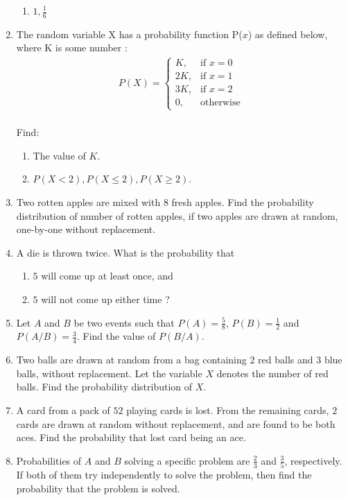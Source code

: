 \begin{enumerate}[label=\thesection.\arabic*.,ref=\thesection.\theenumi]
\begin{enumerate}
\item $1, \frac{1}{6}$
\end{enumerate}
\item The random variable X has a probability function P($x$) as defined below, where K is some number :
\\ \begin{align}P(X)=\begin{cases} K, & \text{if }  x=0 \\ 2K, & \text{if } x=1\\ 3K, & \text{if } x=2\\ 0, & \text{otherwise  } \end{cases}\end{align}
\\ Find:
\begin{enumerate}
\item The value of $K$.
\item $P(X<2),P(X \le 2), P(X \ge 2)$.
\end{enumerate}
\item Two rotten apples are mixed with 8 fresh apples. Find the probability distribution of number of rotten apples, if two apples are drawn at  random, one-by-one without replacement.

\item A die is thrown twice. What is the probability that 
\begin{enumerate}[label=(\roman*)]
 \item $5$ will come up at least once, and 
 \item $5$ will not come up either time ? 
\end{enumerate}

\item Let $A$ and $B$ be two events such that $P(A)=\frac{5}{8}$, $P(B)=\frac{1}{2}$ and $P(A/B)=\frac{3}{4}$. Find the value of $P(B/A)$.

\item Two balls are drawn at random from a bag containing $2$ red balls and $3$ blue balls, without replacement. Let the variable $X$ denotes the number of red balls. Find the probability distribution of $X$.

\item A card from a pack of $52$ playing cards is lost. From the remaining cards, $2$ cards are drawn at random without replacement, and are found to be both aces. Find the probability that lost card being an ace.

\item Probabilities of $A$ and $B$ solving a specific problem are $\frac{2}{3}$ and $\frac{3}{5}$, respectively. If both of them try independently to solve the problem, then 
find the probability that the problem is solved.


\end{enumerate}
